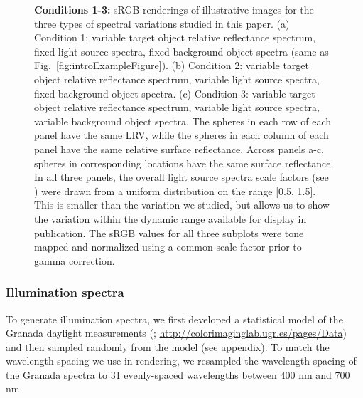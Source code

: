 \documentclass{jov}
\begin{document}
\begin{figure}
\begin{subfigure}{0.33 \textwidth}
        \label{fig:allSpectraVarying}
    \end{subfigure}    
    \caption{{\bf Conditions 1-3:} sRGB renderings of illustrative images for the three types of spectral variations studied in this paper. (a) Condition 1: variable target object relative reflectance spectrum, fixed light source spectra, fixed background object spectra (same as Fig.~\ref{fig:introExampleFigure}). 
(b) Condition 2: variable target object relative reflectance spectrum, variable light source spectra, fixed background object spectra. (c) Condition 3: variable target object relative reflectance spectrum, variable light source spectra, variable background object spectra. The spheres in each row of each panel have the same LRV, while the spheres in each column of each panel have the same relative surface reflectance.  Across panels a-c, spheres in corresponding locations have the same surface reflectance. In all three panels, the overall light source spectra scale factors (see ) were drawn from a uniform distribution on the range [0.5, 1.5]. This is smaller than the variation we studied, but allows us to show the variation within the dynamic range available for display in publication. The sRGB values for all three subplots were tone mapped and normalized using a common scale factor prior to gamma correction.} 
\label{fig:studiedCases}
\end{figure}

\subsubsection{Illumination spectra}
To generate illumination spectra, we first developed a statistical model of the Granada daylight measurements (; \href{http://colorimaginglab.ugr.es/pages/Data}{http://colorimaginglab.ugr.es/pages/Data}) and then sampled randomly from the model (see appendix).
To match the wavelength spacing we use in rendering, we resampled the wavelength spacing of the Granada spectra to
31 evenly-spaced wavelengths between 400 nm and 700 nm.
\end{document}
